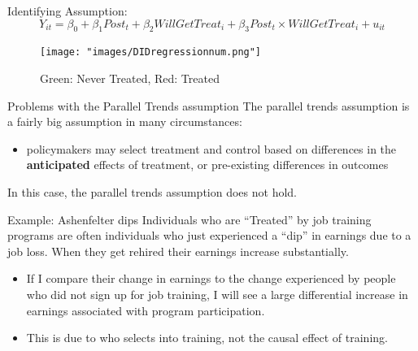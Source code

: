 \documentclass[
  ignorenonframetext,
]{beamer}
\providecommand{\tightlist}{%
  \setlength{\itemsep}{0pt}\setlength{\parskip}{0pt}}
\begin{document}
\begin{frame}{Identifying Assumption:}
\protect\hypertarget{identifying-assumption-1}{}
\[
Y_{it}=\beta_0+\beta_1 Post_t+\beta_2 WillGetTreat_i+\beta_3 Post_t\times WillGetTreat_i+u_{it}
\]

\begin{figure}
\centering
\texttt{[image: "images/DIDregressionnum.png"]}
\caption{Green: Never Treated, Red: Treated}
\end{figure}
\end{frame}

\begin{frame}{Problems with the Parallel Trends assumption}
\protect\hypertarget{problems-with-the-parallel-trends-assumption}{}
The parallel trends assumption is a fairly big assumption in many
circumstances:

\begin{itemize}
\tightlist
\item
  policymakers may select treatment and control based on differences in
  the \textbf{anticipated} effects of treatment, or pre-existing
  differences in outcomes
\end{itemize}

In this case, the parallel trends assumption does not hold.
\end{frame}

\begin{frame}{Example: Ashenfelter dips}
\protect\hypertarget{example-ashenfelter-dips}{}
Individuals who are ``Treated'' by job training programs are often
individuals who just experienced a ``dip'' in earnings due to a job
loss. When they get rehired their earnings increase substantially.

\begin{itemize}
\item
  If I compare their change in earnings to the change experienced by
  people who did not sign up for job training, I will see a large
  differential increase in earnings associated with program
  participation.
\item
  This is due to who selects into training, not the causal effect of
  training.
\end{itemize}
\end{frame}
\end{document}
